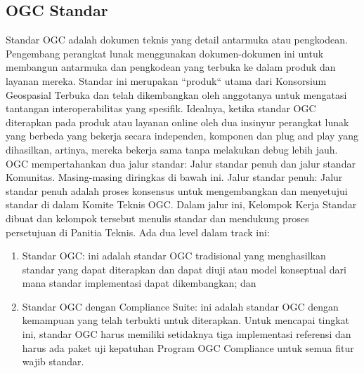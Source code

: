 \subsection{OGC Standar}
Standar OGC adalah dokumen teknis yang detail antarmuka atau pengkodean. Pengembang perangkat lunak menggunakan dokumen-dokumen ini untuk membangun antarmuka dan pengkodean yang terbuka ke dalam produk dan layanan mereka. Standar ini merupakan ``produk`` utama dari Konsorsium Geospasial Terbuka dan telah dikembangkan oleh anggotanya untuk mengatasi tantangan interoperabilitas yang spesifik. Idealnya, ketika standar OGC diterapkan pada produk atau layanan online oleh dua insinyur perangkat lunak yang berbeda yang bekerja secara independen, komponen dan plug and play yang dihasilkan, artinya, mereka bekerja sama tanpa melakukan debug lebih jauh.
OGC mempertahankan dua jalur standar: Jalur standar penuh dan jalur standar Komunitas. Masing-masing diringkas di bawah ini.
Jalur standar penuh: Jalur standar penuh adalah proses konsensus untuk mengembangkan dan menyetujui standar di dalam Komite Teknis OGC. Dalam jalur ini, Kelompok Kerja Standar dibuat dan kelompok tersebut menulis standar dan mendukung proses persetujuan di Panitia Teknis. Ada dua level dalam track ini:
\begin{enumerate}
\item	Standar OGC: ini adalah standar OGC tradisional yang menghasilkan standar yang dapat diterapkan dan dapat diuji atau model konseptual dari mana standar implementasi dapat dikembangkan; dan
\item	Standar OGC dengan Compliance Suite: ini adalah standar OGC dengan kemampuan yang telah terbukti untuk diterapkan. Untuk mencapai tingkat ini, standar OGC harus memiliki setidaknya tiga implementasi referensi dan harus ada paket uji kepatuhan Program OGC Compliance untuk semua fitur wajib standar.
\end{enumerate}

